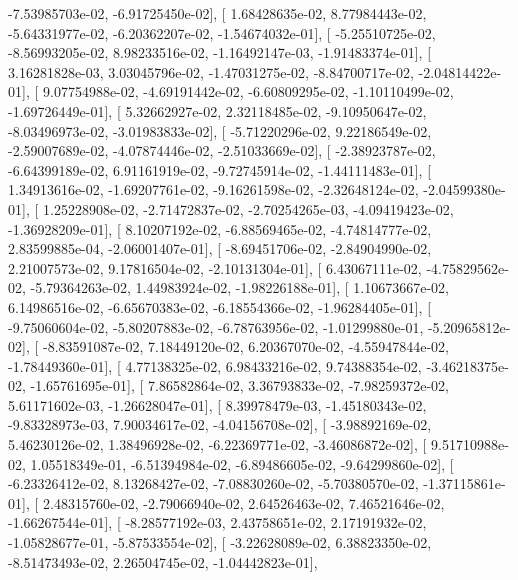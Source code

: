 \documentclass{article}
\begin{document}
         -7.53985703e-02,  -6.91725450e-02],
       [  1.68428635e-02,   8.77984443e-02,  -5.64331977e-02,
         -6.20362207e-02,  -1.54674032e-01],
       [ -5.25510725e-02,  -8.56993205e-02,   8.98233516e-02,
         -1.16492147e-03,  -1.91483374e-01],
       [  3.16281828e-03,   3.03045796e-02,  -1.47031275e-02,
         -8.84700717e-02,  -2.04814422e-01],
       [  9.07754988e-02,  -4.69191442e-02,  -6.60809295e-02,
         -1.10110499e-02,  -1.69726449e-01],
       [  5.32662927e-02,   2.32118485e-02,  -9.10950647e-02,
         -8.03496973e-02,  -3.01983833e-02],
       [ -5.71220296e-02,   9.22186549e-02,  -2.59007689e-02,
         -4.07874446e-02,  -2.51033669e-02],
       [ -2.38923787e-02,  -6.64399189e-02,   6.91161919e-02,
         -9.72745914e-02,  -1.44111483e-01],
       [  1.34913616e-02,  -1.69207761e-02,  -9.16261598e-02,
         -2.32648124e-02,  -2.04599380e-01],
       [  1.25228908e-02,  -2.71472837e-02,  -2.70254265e-03,
         -4.09419423e-02,  -1.36928209e-01],
       [  8.10207192e-02,  -6.88569465e-02,  -4.74814777e-02,
          2.83599885e-04,  -2.06001407e-01],
       [ -8.69451706e-02,  -2.84904990e-02,   2.21007573e-02,
          9.17816504e-02,  -2.10131304e-01],
       [  6.43067111e-02,  -4.75829562e-02,  -5.79364263e-02,
          1.44983924e-02,  -1.98226188e-01],
       [  1.10673667e-02,   6.14986516e-02,  -6.65670383e-02,
         -6.18554366e-02,  -1.96284405e-01],
       [ -9.75060604e-02,  -5.80207883e-02,  -6.78763956e-02,
         -1.01299880e-01,  -5.20965812e-02],
       [ -8.83591087e-02,   7.18449120e-02,   6.20367070e-02,
         -4.55947844e-02,  -1.78449360e-01],
       [  4.77138325e-02,   6.98433216e-02,   9.74388354e-02,
         -3.46218375e-02,  -1.65761695e-01],
       [  7.86582864e-02,   3.36793833e-02,  -7.98259372e-02,
          5.61171602e-03,  -1.26628047e-01],
       [  8.39978479e-03,  -1.45180343e-02,  -9.83328973e-03,
          7.90034617e-02,  -4.04156708e-02],
       [ -3.98892169e-02,   5.46230126e-02,   1.38496928e-02,
         -6.22369771e-02,  -3.46086872e-02],
       [  9.51710988e-02,   1.05518349e-01,  -6.51394984e-02,
         -6.89486605e-02,  -9.64299860e-02],
       [ -6.23326412e-02,   8.13268427e-02,  -7.08830260e-02,
         -5.70380570e-02,  -1.37115861e-01],
       [  2.48315760e-02,  -2.79066940e-02,   2.64526463e-02,
          7.46521646e-02,  -1.66267544e-01],
       [ -8.28577192e-03,   2.43758651e-02,   2.17191932e-02,
         -1.05828677e-01,  -5.87533554e-02],
       [ -3.22628089e-02,   6.38823350e-02,  -8.51473493e-02,
          2.26504745e-02,  -1.04442823e-01],
\end{document}
